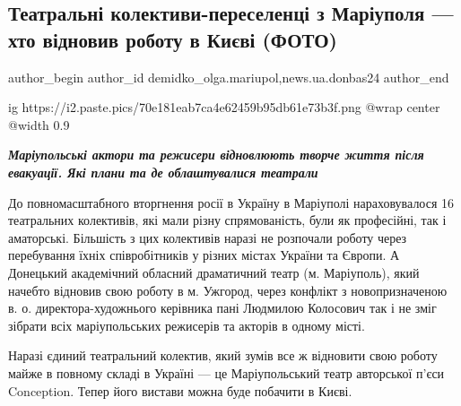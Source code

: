  
 
 
 
 
 
\subsection{Театральні колективи-переселенці з Маріуполя — хто відновив роботу в Києві (ФОТО)}
\label{sec:24_06_2022.stz.news.ua.donbas24.1.teatralni_kollektyvy_pereselenci_v_kyevi}
 
\ifcmt
 author_begin
   author_id demidko_olga.mariupol,news.ua.donbas24
 author_end
\fi

\ifcmt
  ig https://i2.paste.pics/70e181eab7ca4e62459b95db61e73b3f.png
  @wrap center
  @width 0.9
\fi

\begin{center}
  \em\color{blue}\bfseries\Large
Маріупольські актори та режисери відновлюють творче життя після евакуації. Які
плани та де облаштувалися театрали
\end{center}

До повномасштабного вторгнення росії в Україну в Маріуполі нараховувалося 16
театральних колективів, які мали різну спрямованість, були як професійні, так і
аматорські. Більшість з цих колективів наразі не розпочали роботу через
перебування їхніх співробітників у різних містах України та Європи. А Донецький
академічний обласний драматичний театр (м. Маріуполь), який начебто відновив
свою роботу в м. Ужгород, через конфлікт з новопризначеною в. о.
директора-художнього керівника пані Людмилою Колосович так і не зміг зібрати
всіх маріупольських режисерів та акторів в одному місті.

Наразі єдиний театральний колектив, який зумів все ж відновити свою роботу
майже в повному складі в Україні — це Маріупольський театр авторської п'єси
Conception. Тепер його вистави можна буде побачити в Києві. 

